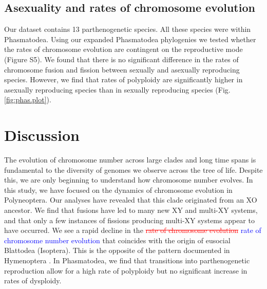 \documentclass[]{rsos}%
\begin{document}
\subsection{Asexuality and rates of chromosome evolution}
Our dataset contains 13 parthenogenetic species.
All these species were within Phasmatodea.
Using our expanded Phasmatodea phylogenies we tested whether the rates of chromosome evolution are contingent on the reproductive mode (Figure S5).
We found that there is no significant difference in the rates of chromosome fusion and fission between sexually and asexually reproducing species.
However, we find that rates of polyploidy are significantly higher in asexually reproducing species than in sexually reproducing species (Fig. \ref{fig:phas.plot}).

\section{Discussion}

The evolution of chromosome number across large clades and long time spans is fundamental to the diversity of genomes we observe across the tree of life.
Despite this, we are only beginning to understand how chromosome number evolves.
In this study, we have focused on the dynamics of chromosome evolution in Polyneoptera. 
Our analyses have revealed that this clade originated from an XO ancestor. 
We find that fusions have led to many new XY and multi-XY systems, and that only a few instances of fissions producing multi-XY systems appear to have occurred.
We see a rapid decline in the \textcolor{red}{\st{rate of chromosome evolution}} \textcolor{blue}{rate of chromosome number evolution} that coincides with the origin of eusocial Blattodea (Isoptera).
This is the opposite of the pattern documented in Hymenoptera \cite{ross2015}.
In Phasmatodea, we find that transitions into parthenogenetic reproduction allow for a high rate of polyploidy but no significant increase in rates of dysploidy.
\end{document}
